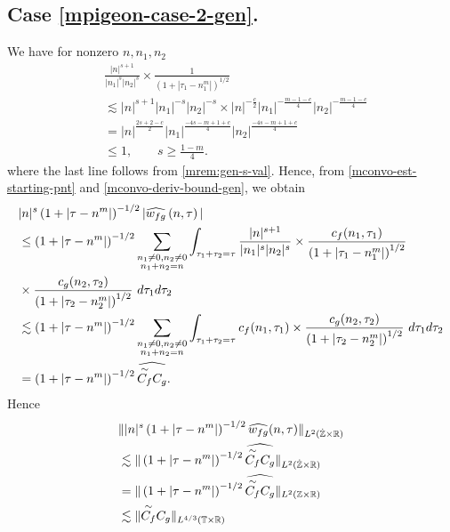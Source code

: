 \subsection{Case \texorpdfstring{\eqref{mpigeon-case-2-gen}}{2}.}
We have for nonzero $ n, n_1, n_2 $
%
\begin{equation}
	\label{mconvo-deriv-bound-gen}
	\begin{split}
		& \frac{|n|^{s+1}}{|n_1|^s 
		| n_2|^s}
		\times
		\frac{1}{(1 + | \tau_1 -n_1^m |)^{1/2}}
		\\
		& \lesssim | n |^{s+1}| n_1 |^{-s}| n_2 |^{-s} \times | n
		|^{-\frac{c}{2}}| n_1 |^{-\frac{m-1-c}{4}}| n_2 |^{-\frac{m-1-c}{4}} 
		\\
		& = | n |^{\frac{2s+2 -c}{2}} | n_1 |^{\frac{-4s -m + 1+ c}{4}} | n_2
		|^\frac{-4s -m + 1+ c}{4}
		\\
		& \le 1, \qquad s \ge \frac{1-m}{4}.
	\end{split}  
\end{equation}
%
%
where the last line follows from \cref{mrem:gen-s-val}.
Hence, from \eqref{mconvo-est-starting-pnt} and \eqref{mconvo-deriv-bound-gen},
we obtain 
\begin{equation}
	\label{mconvo-est-starting-pnt-gen}
	\begin{split}
		 & |n|^s \left( 1 + | \tau - n^m | \right)^{-1/2} | \widehat{w_{fg}}\left( 
		n, \tau \right) |
		\\
		& \le \left( 1 + | \tau - n^m | \right)^{-1/2}
		\sum_{\substack{n_1 \neq0, n_2 \neq 0 \\n_1 + n_2 =n}} \int_{\tau_1 + \tau_2 = \tau}\frac{|n|^{s+1}}{|n_1|^s | n_2|^s} 
		\times \frac{c_f(n_1, \tau_1)}{\left( 1 + | \tau_1 - n_1^m | 
		\right)^{1/2}}
		\\
		& \times
		\frac{c_g(n_2, \tau_2)}{\left( 1 + | \tau_2 - n_2^m | 
		\right)^{1/2}}\ d \tau_1 d \tau_2
		\\
		& \lesssim \left( 1 + | \tau - n^m | \right)^{-1/2}
		\sum_{\substack{n_1 \neq0, n_2 \neq 0 \\n_1 + n_2 =n}} \int_{\tau_1 + \tau_2
		= \tau} c_f(n_1, \tau_1) \times
		\frac{c_g(n_2, \tau_2)}{\left( 1 + | \tau_2 - n_2^m | 
		\right)^{1/2}}\ d \tau_1 d \tau_2
		\\
		& = \left( 1 + | \tau - n^m | \right)^{-1/2}
\widehat{\overset{\sim}{C_f} C_g}.
	\end{split}
\end{equation}
%
%
%
Hence
%
\begin{equation}
	\label{m3f-gen}
	\begin{split}
		& \| |n|^s \left( 1 + | \tau - n^m | \right)^{-1/2} \widehat{w_{fg}}(n, \tau) 
		\|_{L^2(\dot{\mathbb{Z}} \times \mathbb{R})}
		\\
		& \lesssim \|\left( 1 + | \tau - n^m | \right)^{-1/2} 
		\widehat{\overset{\sim}{C_f} C_g } \|_{L^2(\dot{\mathbb{Z}} \times \mathbb{R})}
		\\
		& =  \|\left( 1 + | \tau - n^m | \right)^{-1/2} 
		\widehat{\overset{\sim}{C_f} C_g } \|_{L^2(\mathbb{Z} \times \mathbb{R})}
		\\
		& \lesssim  \|\overset{\sim}{C_f} C_g  \|_{L^{4/3}(\mathbb{T} \times \mathbb{R})}
	\end{split}
\end{equation}
